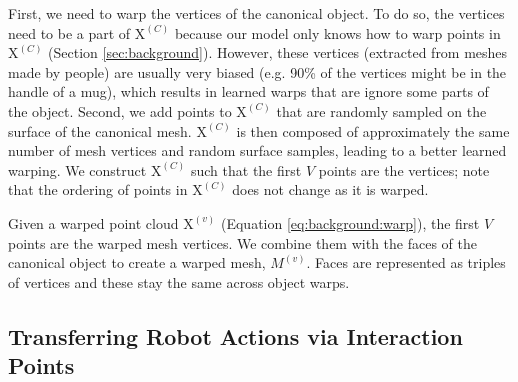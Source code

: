 \documentclass{article}
\newcommand{\pcx}[1]{\mathrm{X}^{(#1)}}
\newcommand{\pcc}{\pcx{C}}
\begin{document}
First, we need to warp the vertices of the canonical object. To do so, the vertices need to be a part of $\pcc$ because our model only knows how to warp points in $\pcc$ (Section \ref{sec:background}). However, these vertices (extracted from meshes made by people) are usually very biased (e.g. 90\% of the vertices might be in the handle of a mug), which results in learned warps that are ignore some parts of the object. Second, we add points to $\pcc$ that are randomly sampled on the surface of the canonical mesh. $\pcc$ is then composed of approximately the same number of mesh vertices and random surface samples, leading to a better learned warping. We construct $\pcc$ such that the first $V$ points are the vertices; note that the ordering of points in $\pcc$ does not change as it is warped.

Given a warped point cloud $\pcx{v}$ (Equation \ref{eq:background:warp}), the first $V$ points are the warped mesh vertices. We combine them with the faces of the canonical object to create a warped mesh, $M^{(v)}$. Faces are represented as triples of vertices and these stay the same across object warps.

\subsection{Transferring Robot Actions via Interaction Points}
\label{sec:method:cloning}
\end{document}
